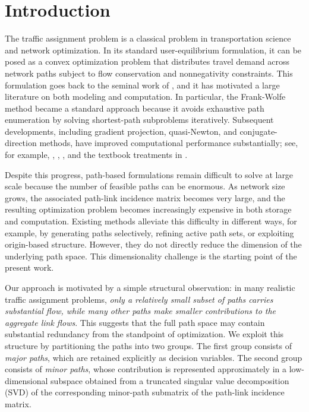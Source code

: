 \documentclass[11pt]{article}
\begin{document}
\section{Introduction}\label{sec:intro}
The traffic assignment problem is a classical problem in transportation science and network optimization. In its standard user-equilibrium formulation, it can be posed as a convex optimization problem that distributes travel demand across network paths subject to flow conservation and nonnegativity constraints. This formulation goes back to the seminal work of \cite{beckmann1956studies}, and it has motivated a large literature on both modeling and computation. In particular, the Frank-Wolfe method \cite{frank1956algorithm} became a standard approach because it avoids exhaustive path enumeration by solving shortest-path subproblems iteratively. Subsequent developments, including gradient projection, quasi-Newton, and conjugate-direction methods, have improved computational performance substantially; see, for example, \cite{jayakrishnan1994fast}, \cite{bertsekas1980class, bertsekas2011centralized}, \cite{mitradjieva2013stiff}, and the textbook treatments in \cite{sheffi1985urban, ahuja1993network, patriksson1994traffic, bertsekas1998network, boyles2020transportation}.

Despite this progress, path-based formulations remain difficult to solve at large scale because the number of feasible paths can be enormous. As network size grows, the associated path-link incidence matrix becomes very large, and the resulting optimization problem becomes increasingly expensive in both storage and computation. Existing methods alleviate this difficulty in different ways, for example, by generating paths selectively, refining active path sets, or exploiting origin-based structure. However, they do not directly reduce the dimension of the underlying path space. This dimensionality challenge is the starting point of the present work.

Our approach is motivated by a simple structural observation: in many realistic traffic assignment problems, \emph{only a relatively small subset of paths carries substantial flow, while many other paths make smaller contributions to the aggregate link flows}. This suggests that the full path space may contain substantial redundancy from the standpoint of optimization. We exploit this structure by partitioning the paths into two groups. The first group consists of \emph{major paths}, which are retained explicitly as decision variables. The second group consists of \emph{minor paths}, whose contribution is represented approximately in a low-dimensional subspace obtained from a truncated singular value decomposition (SVD) of the corresponding minor-path submatrix of the path-link incidence matrix.
\end{document}
